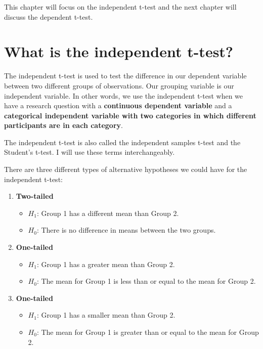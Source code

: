 \documentclass[
]{book}
\providecommand{\tightlist}{%
  \setlength{\itemsep}{0pt}\setlength{\parskip}{0pt}}
\begin{document}
This chapter will focus on the independent t-test and the next chapter will discuss the dependent t-test.

\hypertarget{what-is-the-independent-t-test}{%
\section{What is the independent t-test?}\label{what-is-the-independent-t-test}}

The independent t-test is used to test the difference in our dependent variable between two different groups of observations. Our grouping variable is our independent variable. In other words, we use the independent t-test when we have a research question with a \textbf{continuous dependent variable} and a \textbf{categorical independent variable with two categories in which different participants are in each category}.

The independent t-test is also called the independent samples t-test and the Student's t-test. I will use these terms interchangeably.

There are three different types of alternative hypotheses we could have for the independent t-test:

\begin{enumerate}
\def\labelenumi{\arabic{enumi}.}
\item
  \textbf{Two-tailed}

  \begin{itemize}
  \tightlist
  \item
    \(H_1\): Group 1 has a different mean than Group 2.
  \item
    \(H_0\): There is no difference in means between the two groups.
  \end{itemize}
\item
  \textbf{One-tailed}

  \begin{itemize}
  \tightlist
  \item
    \(H_1\): Group 1 has a greater mean than Group 2.
  \item
    \(H_0\): The mean for Group 1 is less than or equal to the mean for Group 2.
  \end{itemize}
\item
  \textbf{One-tailed}

  \begin{itemize}
  \tightlist
  \item
    \(H_1\): Group 1 has a smaller mean than Group 2.
  \item
    \(H_0\): The mean for Group 1 is greater than or equal to the mean for Group 2.
  \end{itemize}
\end{enumerate}
\end{document}

